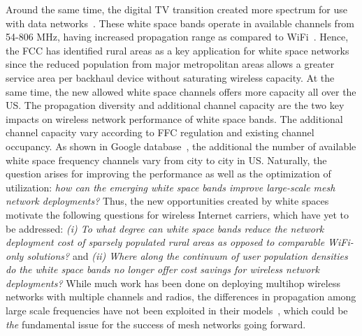 Around the same time, the digital TV transition created more
spectrum for use with data networks~\cite{fccwhitespace}. These white 
space bands operate in available channels from 54-806 MHz, having
increased propagation range as compared to WiFi~\cite{balanis2012antenna}. 
Hence, the FCC has identified rural areas as a key application for 
white space networks since the reduced
population from major metropolitan areas allows a greater service area
per backhaul device without saturating wireless capacity.
At the same time, the new allowed white space channels
offers more capacity all over the US. The propagation diversity
and additional channel capacity are the two key impacts on
wireless network performance of white space bands.
The additional channel capacity vary according to FFC regulation and
existing channel occupancy. As shown in Google database~\cite{googledatabase}, 
the additional the number of available white
space frequency channels vary from city to city in US. 
Naturally, the question arises for improving the performance
as well as the optimization of utilization: {\it how can the emerging white space bands improve 
large-scale mesh network deployments?} 
Thus, the new opportunities created by white spaces motivate the following 
questions for wireless Internet carriers, which have yet to be addressed: 
{\it (i) To what degree can white space bands reduce the network deployment cost of
sparsely populated rural areas as opposed to comparable WiFi-only solutions?} and 
{\it (ii) Where along the continuum of user population densities do the white
space bands no longer offer cost savings for wireless network deployments?}
While much work has been done 
on deploying multihop wireless networks with multiple channels and 
radios, the differences in propagation among large scale frequencies 
have not been exploited in their models~\cite{tang2005interference, long2013fair,doraghinejad2014channel}, 
which could be {\it the} fundamental issue for the success of mesh 
networks going forward. 

